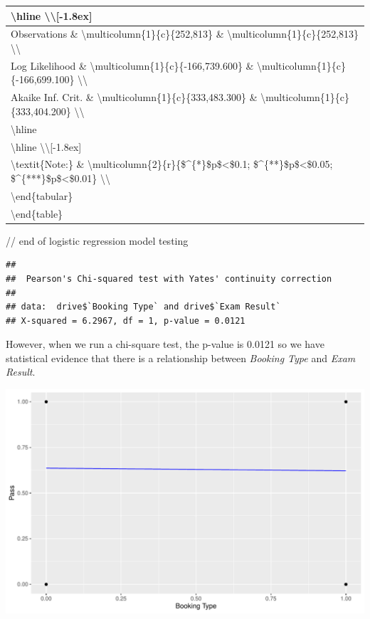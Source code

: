 \documentclass[11pt,a4paper,]{article}
\begin{document}
\begin{tabular}{l}
\hline
\textbackslash{}hline \textbackslash{}\textbackslash{}[-1.8ex]\\
\hline
Observations \& \textbackslash{}multicolumn\{1\}\{c\}\{252,813\} \& \textbackslash{}multicolumn\{1\}\{c\}\{252,813\} \textbackslash{}\textbackslash{}\\
\hline
Log Likelihood \& \textbackslash{}multicolumn\{1\}\{c\}\{-166,739.600\} \& \textbackslash{}multicolumn\{1\}\{c\}\{-166,699.100\} \textbackslash{}\textbackslash{}\\
\hline
Akaike Inf. Crit. \& \textbackslash{}multicolumn\{1\}\{c\}\{333,483.300\} \& \textbackslash{}multicolumn\{1\}\{c\}\{333,404.200\} \textbackslash{}\textbackslash{}\\
\hline
\textbackslash{}hline\\
\hline
\textbackslash{}hline \textbackslash{}\textbackslash{}[-1.8ex]\\
\hline
\textbackslash{}textit\{Note:\}  \& \textbackslash{}multicolumn\{2\}\{r\}\{\$\textasciicircum{}\{*\}\$p\$<\$0.1; \$\textasciicircum{}\{**\}\$p\$<\$0.05; \$\textasciicircum{}\{***\}\$p\$<\$0.01\} \textbackslash{}\textbackslash{}\\
\hline
\textbackslash{}end\{tabular\}\\
\hline
\textbackslash{}end\{table\}\\
\hline
\end{tabular}

// end of logistic regression model testing

\begin{verbatim}
## 
##  Pearson's Chi-squared test with Yates' continuity correction
## 
## data:  drive$`Booking Type` and drive$`Exam Result`
## X-squared = 6.2967, df = 1, p-value = 0.0121
\end{verbatim}

However, when we run a chi-square test, the p-value is 0.0121 so we have statistical evidence that there is a relationship between \emph{Booking Type} and \emph{Exam Result}.

\begin{center}\includegraphics{Assignment4_files/figure-latex/plot_bookingtype_model-1} \end{center}

\printbibliography
\end{document}
